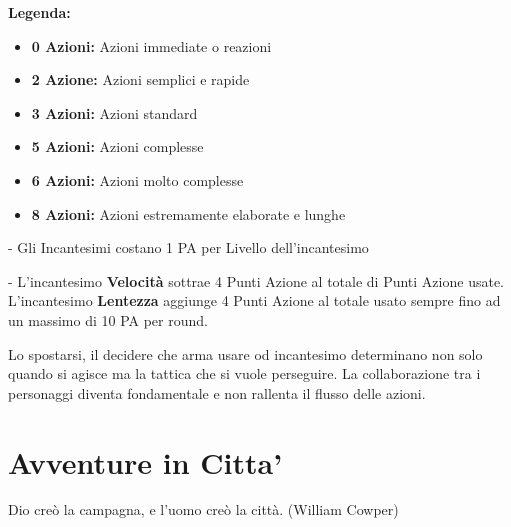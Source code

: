 \documentclass[a4paper,twoside,openany]{book}
\begin{document}
\vspace{0.5cm}

\noindent\textbf{Legenda:}
\begin{itemize}
	\item \textbf{0 Azioni:} Azioni immediate o reazioni
	\item \textbf{2 Azione:} Azioni semplici e rapide
	\item \textbf{3 Azioni:} Azioni standard
	\item \textbf{5 Azioni:} Azioni complesse
	\item \textbf{6 Azioni:} Azioni molto complesse
	\item \textbf{8 Azioni:} Azioni estremamente elaborate e lunghe
\end{itemize}

\medskip

- Gli Incantesimi costano 1 PA per Livello dell'incantesimo

- L'incantesimo \textbf{Velocità} sottrae 4 Punti Azione al totale di Punti Azione usate. L'incantesimo \textbf{Lentezza} aggiunge 4 Punti Azione al totale usato sempre fino ad un massimo di 10 PA per round.

Lo spostarsi, il decidere che arma usare od incantesimo determinano non solo quando si agisce ma la tattica che si vuole perseguire. La collaborazione tra i personaggi diventa fondamentale e non rallenta il flusso delle azioni.

\section{Avventure in Citta'}

\label{avventure-in-citta}
\begin{changemargin}{0.3cm}{0.3cm}\begin{enfasi}{
Dio creò la campagna, e l'uomo creò la città. (William Cowper)}\end{enfasi}\end{changemargin}\medskip
\end{document}
